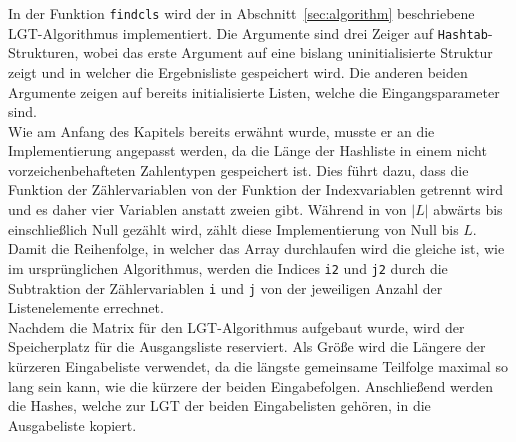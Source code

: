 \documentclass[a4paper,titlepage,12pt]{scrartcl}
\begin{document}
In der Funktion \texttt{findcls} wird der in Abschnitt~\ref{sec:algorithm} beschriebene LGT-Algorithmus implementiert.
Die Argumente sind drei Zeiger auf \texttt{Hashtab}-Strukturen,
wobei das erste Argument auf eine bislang uninitialisierte Struktur zeigt und in welcher die Ergebnisliste gespeichert wird.
Die anderen beiden Argumente zeigen auf bereits initialisierte Listen,
welche die Eingangsparameter sind.
\\
Wie am Anfang des Kapitels bereits erwähnt wurde,
musste er an die Implementierung angepasst werden,
da die Länge der Hashliste in einem nicht vorzeichenbehafteten Zahlentypen gespeichert ist.
Dies führt dazu,
dass die Funktion der Zählervariablen von der Funktion der Indexvariablen getrennt wird und es daher vier Variablen anstatt zweien gibt.
Während in \citet{web:eppstein} von $|L|$ abwärts bis einschließlich Null gezählt wird,
zählt diese Implementierung von Null bis $L$.
Damit die Reihenfolge,
in welcher das Array durchlaufen wird die gleiche ist,
wie im ursprünglichen Algorithmus,
werden die Indices \texttt{i2} und \texttt{j2} durch die Subtraktion der Zählervariablen \texttt{i} und \texttt{j} von der jeweiligen Anzahl der Listenelemente errechnet.
\\
Nachdem die Matrix für den LGT-Algorithmus aufgebaut wurde,
wird der Speicherplatz für die Ausgangsliste reserviert.
Als Größe wird die Längere der kürzeren Eingabeliste verwendet,
da die längste gemeinsame Teilfolge maximal so lang sein kann,
wie die kürzere der beiden Eingabefolgen.
Anschließend werden die Hashes,
welche zur LGT der beiden Eingabelisten gehören,
in die Ausgabeliste kopiert.
\end{document}

